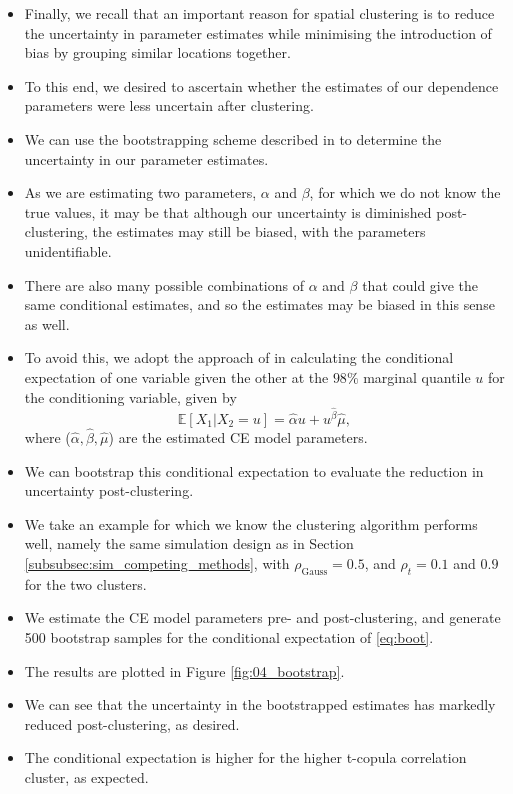 \documentclass{article}
\numberwithin{equation}{section}
\begin{document}
\begin{itemize}
  \item Finally, we recall that an important reason for spatial clustering is to reduce the uncertainty in parameter estimates while minimising the introduction of bias by grouping similar locations together.
  \item To this end, we desired to ascertain whether the estimates of our dependence parameters were less uncertain after clustering.
  \item We can use the bootstrapping scheme described in \cite{Heffernan2004} to determine the uncertainty in our parameter estimates. 
  \item As we are estimating two parameters, $\alpha$ and $\beta$, for which we do not know the true values, it may be that although our uncertainty is diminished post-clustering, the estimates may still be biased, with the parameters unidentifiable.
  \item There are also many possible combinations of $\alpha$ and $\beta$ that could give the same conditional estimates, and so the estimates may be biased in this sense as well.
  \item To avoid this, we adopt the approach of \cite{Richards2021-qm} in calculating the conditional expectation of one variable given the other at the $98\%$ marginal quantile $u$ for the conditioning variable, given by
  \begin{equation} \label{eq:boot}
    \mathbb{E}[X_1 | X_2 = u] = \hat{\alpha} u + u^{\hat{\beta}} \hat{\mu},
  \end{equation}
  where ($\hat{\alpha}, \hat{\beta}, \hat{\mu}$) are the estimated CE model parameters.
  \item We can bootstrap this conditional expectation to evaluate the reduction in uncertainty post-clustering. 
\end{itemize}

\begin{itemize}
  \item We take an example for which we know the clustering algorithm performs well, namely the same simulation design as in Section \ref{subsubsec:sim_competing_methods}, with $\rho_{\text{Gauss}} = 0.5$, and $\rho_{t} = 0.1$ and $0.9$ for the two clusters.
  \item We estimate the CE model parameters pre- and post-clustering, and generate 500 bootstrap samples for  the conditional expectation of \eqref{eq:boot}.
  \item The results are plotted in Figure \ref{fig:04_bootstrap}.
  \item We can see that the uncertainty in the bootstrapped estimates has markedly reduced post-clustering, as desired.
  \item The conditional expectation is higher for the higher t-copula correlation cluster, as expected. 

\end{itemize}
\end{document}
